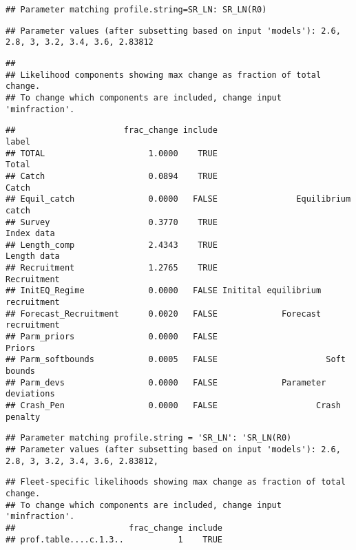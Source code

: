 \documentclass[
]{article}
\begin{document}
\begin{verbatim}
## Parameter matching profile.string=SR_LN: SR_LN(R0)
\end{verbatim}

\begin{verbatim}
## Parameter values (after subsetting based on input 'models'): 2.6, 2.8, 3, 3.2, 3.4, 3.6, 2.83812
\end{verbatim}

\begin{verbatim}
## 
## Likelihood components showing max change as fraction of total change.
## To change which components are included, change input 'minfraction'.
\end{verbatim}

\begin{verbatim}
##                      frac_change include                            label
## TOTAL                     1.0000    TRUE                            Total
## Catch                     0.0894    TRUE                            Catch
## Equil_catch               0.0000   FALSE                Equilibrium catch
## Survey                    0.3770    TRUE                       Index data
## Length_comp               2.4343    TRUE                      Length data
## Recruitment               1.2765    TRUE                      Recruitment
## InitEQ_Regime             0.0000   FALSE Initital equilibrium recruitment
## Forecast_Recruitment      0.0020   FALSE             Forecast recruitment
## Parm_priors               0.0000   FALSE                           Priors
## Parm_softbounds           0.0005   FALSE                      Soft bounds
## Parm_devs                 0.0000   FALSE             Parameter deviations
## Crash_Pen                 0.0000   FALSE                    Crash penalty
\end{verbatim}

\begin{verbatim}
## Parameter matching profile.string = 'SR_LN': 'SR_LN(R0)
## Parameter values (after subsetting based on input 'models'): 2.6, 2.8, 3, 3.2, 3.4, 3.6, 2.83812,
\end{verbatim}

\begin{verbatim}
## Fleet-specific likelihoods showing max change as fraction of total change.
## To change which components are included, change input 'minfraction'.
##                       frac_change include
## prof.table....c.1.3..           1    TRUE
\end{verbatim}
\end{document}
